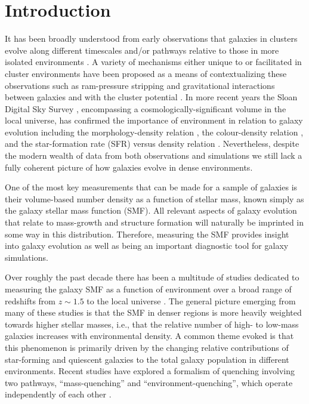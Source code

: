 \documentclass[a4paper,fleqn,usenatbib]{mnras}
\begin{document}



\section{Introduction}


It has been broadly understood from early observations that galaxies in clusters evolve along different timescales and/or pathways 
relative to those in more isolated environments \citep[e.g.][]{Gunn1972, Oemler1974, Dressler1980}.
A variety of mechanisms either unique to or facilitated in cluster environments have been proposed as a means of contextualizing these observations such as ram-pressure stripping \citep{Gunn1972} and gravitational interactions between galaxies \citep{Richstone1976} and with the cluster potential \citep{Farouki1981}.
In more recent years the Sloan Digital Sky Survey \citep[SDSS: ][]{York2000}, encompassing a cosmologically-significant volume in the local universe, has confirmed the importance of environment in relation to galaxy evolution including the morphology-density relation \citep{Goto2003b}, the colour-density relation \citep{Hogg2004}, and the star-formation rate (SFR) versus density relation \citep{Gomez2003}.
Nevertheless, despite the modern wealth of data from both observations and simulations we still lack a fully coherent picture of how galaxies evolve in dense environments.


One of the most key measurements that can be made for a sample of galaxies is their volume-based number density as a function of stellar mass, known simply as the galaxy stellar mass function (SMF).
All relevant aspects of galaxy evolution that relate to mass-growth and structure formation will naturally be imprinted in some way in this distribution.
Therefore, measuring the SMF provides insight into galaxy evolution as well as being an important diagnostic tool for galaxy simulations.


Over roughly the past decade there has been a multitude of studies dedicated to measuring the galaxy SMF as a function of environment over a broad range of redshifts from $z \sim 1.5$ to the local universe \citep{Bundy2006, Peng2010, Bolzonella2010, Giodini2012, Vulcani2012, Vulcani2013, Calvi2013, vanderBurg2013, Mortlock2015, Hahn2015, Davidzon2016}.
The general picture emerging from many of these studies is that the SMF in denser regions is more heavily weighted towards higher stellar masses, i.e., that the relative number of high- to low-mass galaxies increases with environmental density.
A common theme evoked is that this phenomenon is primarily driven by the changing relative contributions of star-forming and quiescent galaxies to the total galaxy population in different environments.
Recent studies have explored a formalism of quenching involving two pathways, ``mass-quenching'' and ``environment-quenching'', which operate independently of each other \citep{Peng2010, Muzzin2012, Quadri2012}.
\end{document}
